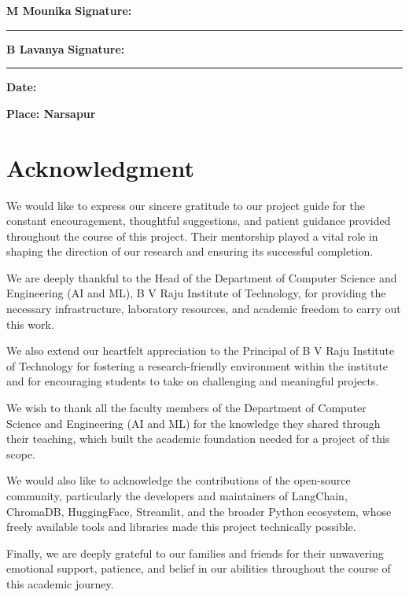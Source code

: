 \documentclass[12pt,a4paper]{report}
\begin{document}
\noindent \textbf{M Mounika} \hfill \textbf{Signature:} \rule{2in}{0.4pt}

\vspace{0.3in}

\noindent \textbf{B Lavanya} \hfill \textbf{Signature:} \rule{2in}{0.4pt}

\vspace{0.5in}

\noindent \textbf{Date:}

\noindent \textbf{Place: Narsapur}


\chapter*{Acknowledgment}

We would like to express our sincere gratitude to our project guide for the constant encouragement, thoughtful suggestions, and patient guidance provided throughout the course of this project. Their mentorship played a vital role in shaping the direction of our research and ensuring its successful completion.

We are deeply thankful to the Head of the Department of Computer Science and Engineering (AI and ML), B V Raju Institute of Technology, for providing the necessary infrastructure, laboratory resources, and academic freedom to carry out this work.

We also extend our heartfelt appreciation to the Principal of B V Raju Institute of Technology for fostering a research-friendly environment within the institute and for encouraging students to take on challenging and meaningful projects.

We wish to thank all the faculty members of the Department of Computer Science and Engineering (AI and ML) for the knowledge they shared through their teaching, which built the academic foundation needed for a project of this scope.

We would also like to acknowledge the contributions of the open-source community, particularly the developers and maintainers of LangChain, ChromaDB, HuggingFace, Streamlit, and the broader Python ecosystem, whose freely available tools and libraries made this project technically possible.

Finally, we are deeply grateful to our families and friends for their unwavering emotional support, patience, and belief in our abilities throughout the course of this academic journey.
\end{document}
